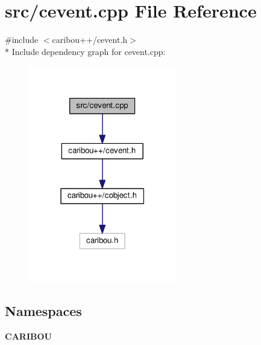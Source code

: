 \section{src/cevent.cpp File Reference}
\label{cevent_8cpp}
{\ttfamily \#include $<$caribou++/cevent.\+h$>$}\\*
Include dependency graph for cevent.\+cpp\+:
\nopagebreak
\begin{figure}[H]
\begin{center}
\leavevmode
\includegraphics[width=183pt]{cevent_8cpp__incl}
\end{center}
\end{figure}
\subsection*{Namespaces}
\begin{DoxyCompactItemize}
\item 
 {\bf C\+A\+R\+I\+B\+OU}
\end{DoxyCompactItemize}
